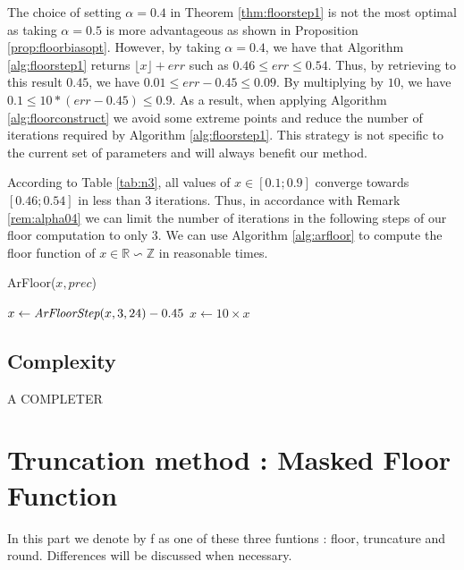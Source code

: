 \documentclass[runningheads]{llncs}
\begin{document}
\begin{remark}\label{rem:alpha04}
  The choice of setting $\alpha=\num{0.4}$ in Theorem \ref{thm:floorstep1} is not the most optimal as taking $\alpha=\num{0.5}$ is more advantageous as shown in Proposition \ref{prop:floorbiasopt}. However, by taking $\alpha = \num{0.4}$, we have that Algorithm \ref{alg:floorstep1} returns $\lfloor x \rfloor + err$ such as $\num{0.46}\leq err \leq \num{0.54}$. Thus, by retrieving to this result $0.45$, we have $\num{0.01} \leq err - \num{0.45} \leq \num{0.09}$. By multiplying by $10$, we have $\num{0.1} \leq 10*(err-\num{0.45}) \leq \num{0.9}$. As a result, when applying Algorithm \ref{alg:floorconstruct} we avoid some extreme points and reduce the number of iterations required by Algorithm \ref{alg:floorstep1}. This strategy is not specific to the current set of parameters and will always benefit our method. 
\end{remark}

According to Table \ref{tab:n3}, all values of $x\in[\num{0.1};\num{0.9}]$ converge towards $[\num{0.46};\num{0.54}]$ in less than $3$ iterations. Thus, in accordance with Remark \ref{rem:alpha04} we can limit the number of iterations in the following steps of our floor computation to only $3$. We can use Algorithm \ref{alg:arfloor} to compute the floor function of $x\in\mathbb{R}\backsim\mathbb{Z}$ in reasonable times.

\begin{algorithm}[H]
  \caption{ArFloor($x,prec$)}
  \label{alg:arfloor}
  $x\leftarrow \emph{ArFloorStep}(x,3,24) -\num{0.45}$\;
  $x \leftarrow 10 \times x$\;
\end{algorithm}

\subsection{Complexity}
A COMPLETER

\section{Truncation method : Masked Floor Function}
In this part we denote by f as one of these three funtions : floor, truncature and round. Differences will be discussed when necessary.
\end{document}

